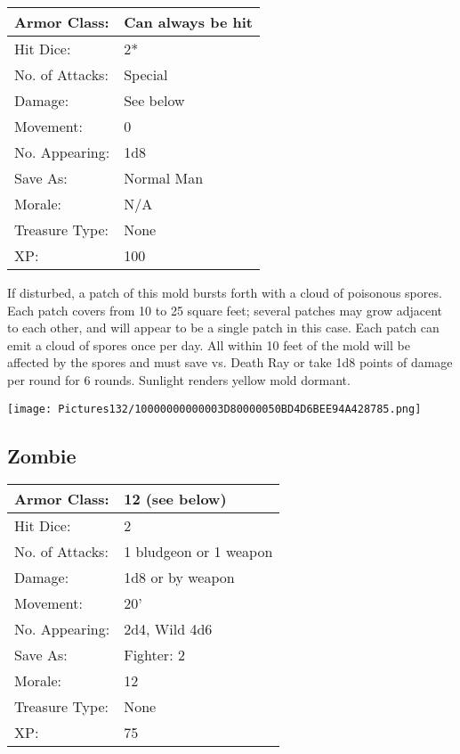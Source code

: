 \documentclass[a4paper,twoside,openany,10pt]{book}
\begin{document}
\begin{multicols}{2}
\begin{tabularx}{0.50\textwidth}{@{}lX@{}}
Armor Class: & Can always be hit \\\hline
Hit Dice: & 2*  \\\hline
No. of Attacks: & Special \\\hline
Damage: & See below \\\hline
Movement: & 0 \\\hline
No. Appearing: & 1d8 \\\hline
Save As: & Normal Man \\\hline
Morale: & N/A \\\hline
Treasure Type: & None \\\hline
XP: & 100 \\\hline
\end{tabularx}

If disturbed, a patch of this mold bursts forth with a cloud of poisonous spores. Each patch covers from 10 to 25 square feet; several patches may grow adjacent to each other, and will appear to be a single patch in this case. Each patch can emit a cloud of spores once per day. All within 10 feet of the mold will be affected by the spores and must save vs. Death Ray or take 1d8 points of damage per round for 6 rounds. Sunlight renders yellow mold dormant.

\begin{center} \texttt{[image: Pictures132/10000000000003D80000050BD4D6BEE94A428785.png]} \end{center}

\subsection*{Zombie}\label{zombie}

\begin{tabularx}{0.50\textwidth}{@{}lX@{}}
Armor Class: & 12 (see below) \\\hline
Hit Dice: & 2 \\\hline
No. of Attacks: & 1 bludgeon or 1 weapon \\\hline
Damage: & 1d8 or by weapon \\\hline
Movement: & 20' \\\hline
No. Appearing: & 2d4, Wild 4d6 \\\hline
Save As: & Fighter: 2 \\\hline
Morale: & 12 \\\hline
Treasure Type: & None \\\hline
XP: & 75 \\\hline
\end{tabularx}\medskip


\end{multicols}
\end{document}
